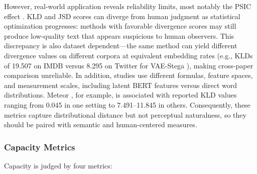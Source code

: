 However, real-world application reveals reliability limits, most notably the PSIC effect \cite{yang2020vae}. KLD and JSD scores can diverge from human judgment as statistical optimization progresses: methods with favorable divergence scores may still produce low-quality text that appears suspicious to human observers. This discrepancy is also dataset dependent---the same method can yield different divergence values on different corpora at equivalent embedding rates (e.g., KLDs of 19.507 on IMDB versus 8.295 on Twitter for VAE-Stega \cite{yang2020vae}), making cross-paper comparison unreliable. In addition, studies use different formulas, feature spaces, and measurement scales, including latent BERT features versus direct word distributions. Meteor \cite{kaptchuk2021meteor}, for example, is associated with reported KLD values ranging from 0.045 in one setting to 7.491--11.845 in others. Consequently, these metrics capture distributional distance but not perceptual naturalness, so they should be paired with semantic and human-centered measures.

\subsubsection{Capacity Metrics}

Capacity is judged by four metrics:

